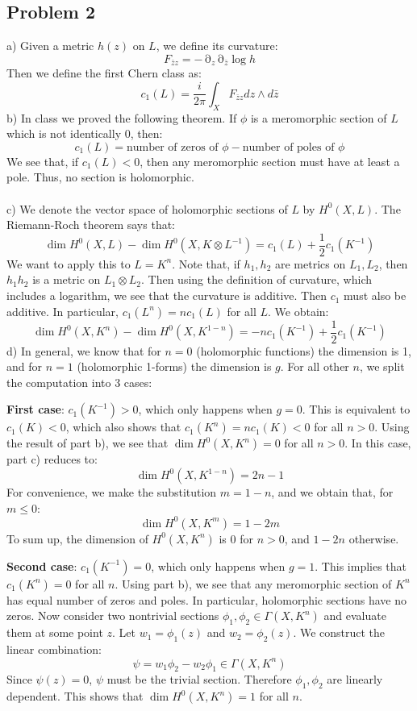 \documentclass[12 pt]{article}
\DeclareMathOperator {\p} {\partial}
\theoremstyle{plain}
\theoremstyle{definition}
\theoremstyle{remark}
\begin{document}
\subsection*{Problem 2}
a) Given a metric $h(z)$ on $L$, we define its curvature:
\[       F_{\bar z z} = - \p_z \p_{\bar z} \log h      \]
Then we define the first Chern class as:
\[       c_1(L) = \frac{i}{2\pi} \int_X F_{\bar z z} dz \wedge d \bar z      \]
b) In class we proved the following theorem. If $\phi$ is a meromorphic section of $L$ which is not identically 0, then:
\[         c_1(L) = \text{number of zeros of } \phi - \text{number of poles of } \phi        \]
We see that, if $c_1(L) < 0$, then any meromorphic section must have at least a pole. Thus, no section is holomorphic.
\\
\\
c) We denote the vector space of holomorphic sections of $L$ by $H^0(X, L)$. The Riemann-Roch theorem says that:
\[            \dim H^0(X,L) - \dim H^0 (X, K \otimes L^{-1}) = c_1 (L) + \frac{1}{2} c_1(K^{-1})         \]
We want to apply this to $L = K^n$. Note that, if $h_1, h_2$ are metrics on $L_1, L_2$, then $h_1 h_2$ is a metric on $L_1 \otimes L_2$. Then using the definition of curvature, which includes a logarithm, we see that the curvature is additive. Then $c_1$ must also be additive. In particular, $c_1(L^n) = n c_1(L)$ for all $L$. We obtain:
\[       \dim H^0(X, K^n) - \dim H^0 (X, K^{1-n}) = -n c_1(K^{-1}) + \frac{1}{2} c_1(K^{-1})       \]
d) In general, we know that for $n=0$ (holomorphic functions) the dimension is 1, and for $n=1$ (holomorphic 1-forms) the dimension is $g$. For all other $n$, we split the computation into 3 cases:

\textbf{First case}: $c_1(K^{-1}) > 0$, which only happens when $g=0$. This is equivalent to $c_1(K) < 0$, which also shows that $c_1(K^n) = n c_1(K) <0$ for all $n>0$. Using the result of part b), we see that $\dim H^0(X, K^n) = 0$ for all $n>0$. In this case, part c) reduces to:
\[        \dim H^0(X, K^{1-n}) = 2n-1      \]
For convenience, we make the substitution $m = 1-n$, and we obtain that, for $m\leq 0$:
\[        \dim H^0(X, K^m) = 1-2m     \]
To sum up, the dimension of $H^0(X,K^n)$ is 0 for $n> 0$, and $1-2n$ otherwise.

\textbf{Second case}: $c_1(K^{-1}) = 0$, which only happens when $g=1$. This implies that $c_1(K^n) = 0$ for all $n$. Using part b), we see that any meromorphic section of $K^n$ has equal number of zeros and poles. In particular, holomorphic sections have no zeros. Now consider two nontrivial sections $\phi_1, \phi_2 \in \Gamma(X, K^n)$ and evaluate them at some point $z$. Let $w_1 = \phi_1(z)$ and $w_2 = \phi_2(z)$. We construct the linear combination:
\[    \psi =   w_1 \phi_2 - w_2 \phi_1   \in \Gamma(X, K^n)  \]
Since $\psi(z) = 0$, $\psi$ must be the trivial section. Therefore $\phi_1, \phi_2$ are linearly dependent. This shows that $\dim H^0(X, K^n) = 1$ for all $n$.
\end{document}
